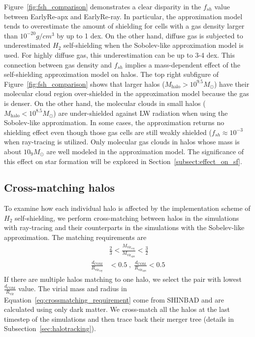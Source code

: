 \documentclass[linenumbers, twocolumn]{aastex631}
\begin{document}
Figure~\ref{fig:fsh_comparison} demonstrates a clear disparity in the $f_{sh}$ value between EarlyRe-apx and EarlyRe-ray. In particular, the approximation model tends to overestimate the amount of shielding for cells with a gas density larger than $10^{-20} g/cm^3$ by up to 1 dex. On the other hand, diffuse gas is subjected to underestimated $H_{2}$ self-shielding when the Sobolev-like approximation model is used. For highly diffuse gas, this underestimation can be up to 3-4 dex. This connection between gas density and $f_{sh}$ implies a mass-dependent effect of the self-shielding approximation model on halos. The top right subfigure of Figure~\ref{fig:fsh_comparison} shows that larger halos ($M_{\text{halo}} > 10^{9.5} M_{\odot}$) have their molecular cloud region over-shielded in the approximation model because the gas is denser. On the other hand, the molecular clouds in small halos ($M_{\text{halo}} < 10^{8.5} M_{\odot}$) are under-shielded against LW radiation when using the Sobolev-like approximation. In some cases, the approximation returns no shielding effect even though those gas cells are still weakly shielded ($f_{sh} \approx 10^{-3}$ when ray-tracing is utilized. Only molecular gas clouds in halos whose mass is about $10_{9} M_\odot$ are well modeled in the approximation model. The significance of this effect on star formation will be explored in Section~\ref{subsect:effect_on_sf}.


\subsection{Cross-matching halos}
\label{subsect:cross-matching_halos}
To examine how each individual halo is affected by the implementation scheme of $H_{2}$ self-shielding, we perform cross-matching between halos in the simulations with ray-tracing and their counterparts in the simulations with the Sobelev-like approximation. The matching requirements are
\begin{align}
    & \frac{2}{3} < \frac{M_{\mathrm{vir}_{\mathrm{ray}}}}{M_{\mathrm{vir}_{\mathrm{apx}}}} < \frac{3}{2} \nonumber \\
    \frac{d_{\text{COM}}}{R_{\mathrm{vir}_{\mathrm{ray}}}} & < 0.5 \; , \; \frac{d_{\text{COM}}}{R_{\mathrm{vir}_{\mathrm{apx}}}} < 0.5 
\label{eq:crossmatching_requirement}
\end{align}
If there are multiple halos matching to one halo, we select the pair with lowest $\frac{d_{\text{COM}}}{R_{\mathrm{vir}}}$ value. The virial mass and radius in Equation~\ref{eq:crossmatching_requirement} come from SHINBAD and are calculated using only dark matter. We cross-match all the halos at the last timestep of the simulations and then trace back their merger tree (details in Subsection~\ref{sec:halotracking}).
\end{document}
